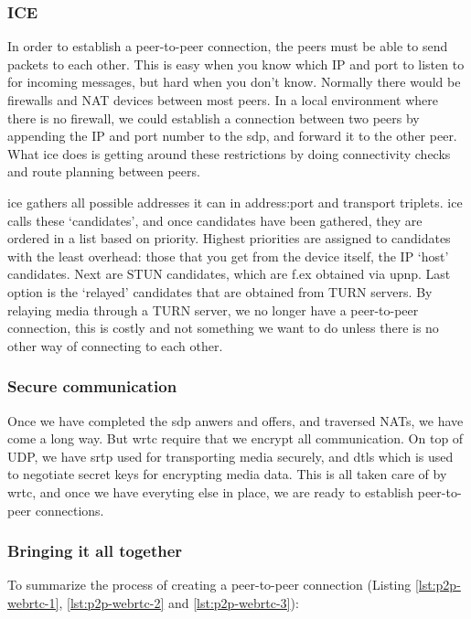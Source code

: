 \subsubsection{ICE}
In order to establish a peer-to-peer connection, the peers must be able to send packets to each other. This is easy when you know which IP and port to listen to for incoming messages, but hard when you don't know. Normally there would be firewalls and NAT devices between most peers. In a local environment where there is no firewall, we could establish a connection between two peers by appending the IP and port number to the \gls{sdp}, and forward it to the other peer. What \gls{ice} does is getting around these restrictions by doing connectivity checks and route planning between peers.

\gls{ice} gathers all possible addresses it can in address:port and transport triplets\cite{ivov_ice_2013}. \gls{ice} calls these `candidates', and once candidates have been gathered, they are ordered in a list based on priority. Highest priorities are assigned to candidates with the least overhead: those that you get from the device itself, the IP `host' candidates. Next are STUN candidates, which are f.ex obtained via \gls{upnp}. Last option is the `relayed' candidates that are obtained from TURN servers. By relaying media through a TURN server, we no longer have a peer-to-peer connection, this is costly and not something we want to do unless there is no other way of connecting to each other.

\subsubsection{Secure communication}
Once we have completed the \gls{sdp} anwers and offers, and traversed NATs, we have come a long way. But \gls{wrtc} require that we encrypt all communication. On top of UDP, we have \gls{srtp} used for transporting media securely, and \gls{dtls} which is used to negotiate secret keys for encrypting media data. This is all taken care of by \gls{wrtc}, and once we have everyting else in place, we are ready to establish peer-to-peer connections.

\subsubsection{Bringing it all together}
To summarize the process of creating a peer-to-peer connection (Listing \ref{lst:p2p-webrtc-1}, \ref{lst:p2p-webrtc-2} and \ref{lst:p2p-webrtc-3}):

